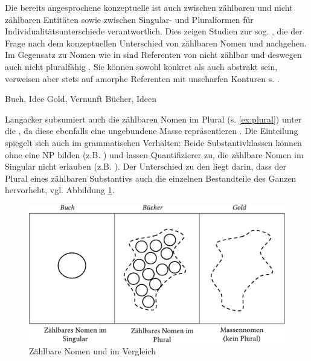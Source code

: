 Die bereits angesprochene konzeptuelle  ist auch zwischen zählbaren und nicht zählbaren Entitäten sowie zwischen Singular- und Pluralformen  für Individualitätsunterschiede  verantwortlich. Dies zeigen Studien zur sog.\linebreak{} \parencite[s.][]{Jackendoff1991, Langacker1991, Bisle-Muller1991, Rijkhoff1991,Rijkhoff2002, Corbett2000, Massam2012,Zifonun2012}, die der Frage nach dem konzeptuellen Unterschied von zählbaren Nomen und  nachgehen. Im Gegensatz zu Nomen wie in  sind Referenten von  nicht zählbar und deswegen auch nicht pluralfähig  \parencite[77]{Langacker1991}. Sie können sowohl konkret  als auch abstrakt  sein, verweisen aber stets auf amorphe Referenten mit unscharfen Konturen s. . 

\begin{exe}
	\ex \label{ex:zaehlbarkeit}
	\begin{xlist}
		\ex \label{ex:count} Buch, Idee
 		\ex \label{ex:mass} Gold, Vernunft
 	 	\ex \label{ex:plural} Bücher, Ideen 
 			\end{xlist}
\end{exe}

\noindent
Langacker subsumiert auch die zählbaren Nomen im Plural  (s. \ref{ex:plural}) unter die , da diese ebenfalls eine ungebundene Masse repräsentieren \parencite[77]{Langacker1991}. Die Einteilung spiegelt sich auch im grammatischen Verhalten: Beide Substantivklassen  können ohne  eine NP  bilden (z.B. ) und lassen Quantifizierer zu, die zählbare Nomen im Singular  nicht erlauben (z.B. ). Der Unterschied zu den  liegt darin, dass der Plural  eines zählbaren Substantivs  auch die einzelnen Bestandteile des Ganzen hervorhebt, vgl. Abbildung \ref{abb:langacker-nomen}.

\begin{figure}[h]
\begin{center}
\includegraphics[width=\textwidth]{images/langacker.pdf}
\caption {Zählbare Nomen und  im Vergleich \\ \parencite[][78]{Langacker1991}}
\label{abb:langacker-nomen}
\end{center}
\end{figure}


